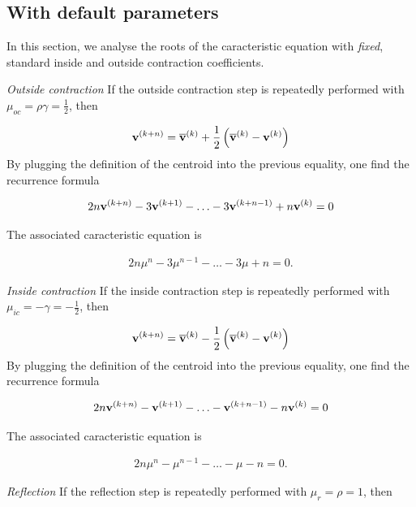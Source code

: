 \subsection{With default parameters}

In this section, we analyse the roots of the caracteristic 
equation with \emph{fixed}, standard inside and outside contraction
coefficients.

\emph{Outside contraction} If the outside contraction step is repeatedly performed
with $\mu_{oc} = \rho\gamma = \frac{1}{2}$, then 

\begin{eqnarray}
\mathbf{v}^{(k+n)} = \overline{\bold{v}}^{(k)} 
+ \frac{1}{2} \left( \overline{\bold{v}}^{(k)} - \mathbf{v}^{(k)}\right) 
\end{eqnarray}
By plugging the definition of the centroid into the previous equality, one 
find the recurrence formula

\begin{eqnarray}
2n \mathbf{v}^{(k+n)} - 3 \mathbf{v}^{(k+1)} - \ldots - 3 \mathbf{v}^{(k+n-1)} + n\mathbf{v}^{(k)} = 0
\end{eqnarray}

The associated caracteristic equation is 

\begin{eqnarray}
\label{recurrence-oc}
2n \mu^n - 3 \mu^{n-1} - \ldots - 3 \mu + n = 0.
\end{eqnarray}

\emph{Inside contraction} If the inside contraction step is repeatedly performed
with $\mu_{ic} = -\gamma = -\frac{1}{2}$, then 

\begin{eqnarray}
\mathbf{v}^{(k+n)} = \overline{\bold{v}}^{(k)} 
- \frac{1}{2} \left( \overline{\bold{v}}^{(k)} - \mathbf{v}^{(k)}\right) 
\end{eqnarray}
By plugging the definition of the centroid into the previous equality, one 
find the recurrence formula

\begin{eqnarray}
2n \mathbf{v}^{(k+n)} - \mathbf{v}^{(k+1)} - \ldots - \mathbf{v}^{(k+n-1)} - n\mathbf{v}^{(k)} = 0
\end{eqnarray}

The associated caracteristic equation is 

\begin{eqnarray}
\label{recurrence-ic}
2n \mu^n - \mu^{n-1} - \ldots - \mu - n = 0.
\end{eqnarray}

\emph{Reflection} If the reflection step is repeatedly performed
with $\mu_r = \rho = 1$, then 


